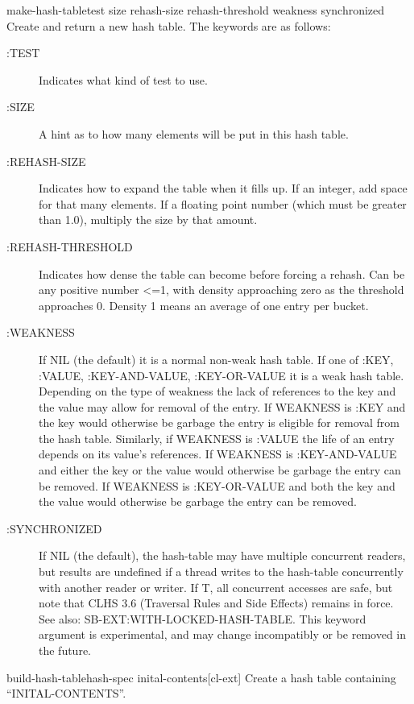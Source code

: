 \documentclass[10pt,english]{book}
\begin{document}
\begin{function}{make-hash-table}{\key test size rehash-size rehash-threshold weakness synchronized}
  Create and return a new hash table. The keywords are as follows:
  \begin{description}
  \item [:TEST] Indicates what kind of test to use.
  \item [:SIZE] A hint as to how many elements will be put in this hash
    table.
  \item [:REHASH-SIZE] Indicates how to expand the table when it
    fills up. If an integer, add space for that many elements. If a
    floating point number (which must be greater than 1.0),
    multiply the size by that amount.
  \item [:REHASH-THRESHOLD] Indicates how dense the table can become before
    forcing a rehash. Can be any positive number <=1, with density
    approaching zero as the threshold approaches 0. Density 1 means an
    average of one entry per bucket.
  \item [:WEAKNESS] If NIL (the default) it is a normal non-weak hash table.
    If one of :KEY, :VALUE, :KEY-AND-VALUE, :KEY-OR-VALUE it is a weak
    hash table.
    Depending on the type of weakness the lack of references to the
    key and the value may allow for removal of the entry. If WEAKNESS
    is :KEY and the key would otherwise be garbage the entry is eligible
    for removal from the hash table. Similarly, if WEAKNESS is :VALUE
    the life of an entry depends on its value's references. If WEAKNESS
    is :KEY-AND-VALUE and either the key or the value would otherwise be
    garbage the entry can be removed. If WEAKNESS is :KEY-OR-VALUE and
    both the key and the value would otherwise be garbage the entry can
    be removed.
  \item [:SYNCHRONIZED] If NIL (the default), the hash-table may
    have multiple concurrent readers, but results are undefined if
    a thread writes to the hash-table concurrently with another
    reader or writer. If T, all concurrent accesses are safe, but
    note that CLHS 3.6 (Traversal Rules and Side Effects) remains
    in force. See also: SB-EXT:WITH-LOCKED-HASH-TABLE. This keyword
    argument is experimental, and may change incompatibly or be
    removed in the future.
  \end{description}
\end{function}

\begin{function}{build-hash-table}{hash-spec inital-contents}[cl-ext]
  Create a hash table containing ``INITAL-CONTENTS''.
\end{function}
\end{document}
